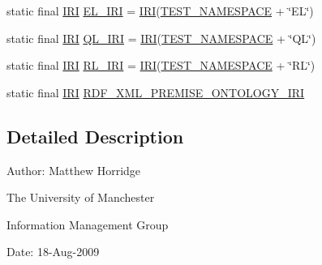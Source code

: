 \begin{DoxyCompactItemize}
\item 
static final \hyperlink{classorg_1_1semanticweb_1_1owlapi_1_1model_1_1_i_r_i}{I\-R\-I} \hyperlink{classorg_1_1semanticweb_1_1owlapi_1_1api_1_1test_1_1ontology_1_1_profile_validation_test_case_a1f42d385d9f41c9ac26a6bc618c4d121}{E\-L\-\_\-\-I\-R\-I} = \hyperlink{classorg_1_1semanticweb_1_1owlapi_1_1model_1_1_i_r_i}{I\-R\-I}(\hyperlink{classorg_1_1semanticweb_1_1owlapi_1_1api_1_1test_1_1ontology_1_1_profile_validation_test_case_a04eaa9905dbac33bf9d2784b8f2993a3}{T\-E\-S\-T\-\_\-\-N\-A\-M\-E\-S\-P\-A\-C\-E} + \char`\"{}E\-L\char`\"{})
\item 
static final \hyperlink{classorg_1_1semanticweb_1_1owlapi_1_1model_1_1_i_r_i}{I\-R\-I} \hyperlink{classorg_1_1semanticweb_1_1owlapi_1_1api_1_1test_1_1ontology_1_1_profile_validation_test_case_a5a5ee3119e25e44874c30300469b86b4}{Q\-L\-\_\-\-I\-R\-I} = \hyperlink{classorg_1_1semanticweb_1_1owlapi_1_1model_1_1_i_r_i}{I\-R\-I}(\hyperlink{classorg_1_1semanticweb_1_1owlapi_1_1api_1_1test_1_1ontology_1_1_profile_validation_test_case_a04eaa9905dbac33bf9d2784b8f2993a3}{T\-E\-S\-T\-\_\-\-N\-A\-M\-E\-S\-P\-A\-C\-E} + \char`\"{}Q\-L\char`\"{})
\item 
static final \hyperlink{classorg_1_1semanticweb_1_1owlapi_1_1model_1_1_i_r_i}{I\-R\-I} \hyperlink{classorg_1_1semanticweb_1_1owlapi_1_1api_1_1test_1_1ontology_1_1_profile_validation_test_case_ad42835982c01ac38cecc901d7cee07d8}{R\-L\-\_\-\-I\-R\-I} = \hyperlink{classorg_1_1semanticweb_1_1owlapi_1_1model_1_1_i_r_i}{I\-R\-I}(\hyperlink{classorg_1_1semanticweb_1_1owlapi_1_1api_1_1test_1_1ontology_1_1_profile_validation_test_case_a04eaa9905dbac33bf9d2784b8f2993a3}{T\-E\-S\-T\-\_\-\-N\-A\-M\-E\-S\-P\-A\-C\-E} + \char`\"{}R\-L\char`\"{})
\item 
static final \hyperlink{classorg_1_1semanticweb_1_1owlapi_1_1model_1_1_i_r_i}{I\-R\-I} \hyperlink{classorg_1_1semanticweb_1_1owlapi_1_1api_1_1test_1_1ontology_1_1_profile_validation_test_case_a6b82fb4ec2c14c8a56e1d44e821d3a95}{R\-D\-F\-\_\-\-X\-M\-L\-\_\-\-P\-R\-E\-M\-I\-S\-E\-\_\-\-O\-N\-T\-O\-L\-O\-G\-Y\-\_\-\-I\-R\-I}
\end{DoxyCompactItemize}


\subsection{Detailed Description}
Author\-: Matthew Horridge\par
 The University of Manchester\par
 Information Management Group\par
 Date\-: 18-\/\-Aug-\/2009 

